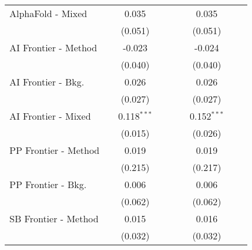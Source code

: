 \begin{tabular}{lcccccccc}
   AlphaFold - Mixed                              &               & 0.035         &       &       &               & 0.035         &       &   \\   
                                                  &               & (0.051)       &       &       &               & (0.051)       &       &   \\   
   AI Frontier - Method                           &               & -0.023        &       &       &               & -0.024        &       &   \\   
                                                  &               & (0.040)       &       &       &               & (0.040)       &       &   \\   
   AI Frontier - Bkg.                             &               & 0.026         &       &       &               & 0.026         &       &   \\   
                                                  &               & (0.027)       &       &       &               & (0.027)       &       &   \\   
   AI Frontier - Mixed                            &               & 0.118$^{***}$ &       &       &               & 0.152$^{***}$ &       &   \\   
                                                  &               & (0.015)       &       &       &               & (0.026)       &       &   \\   
   PP Frontier - Method                           &               & 0.019         &       &       &               & 0.019         &       &   \\   
                                                  &               & (0.215)       &       &       &               & (0.217)       &       &   \\   
   PP Frontier - Bkg.                             &               & 0.006         &       &       &               & 0.006         &       &   \\   
                                                  &               & (0.062)       &       &       &               & (0.062)       &       &   \\   
   SB Frontier - Method                           &               & 0.015         &       &       &               & 0.016         &       &   \\   
                                                  &               & (0.032)       &       &       &               & (0.032)       &       &   \\   

\end{tabular}
